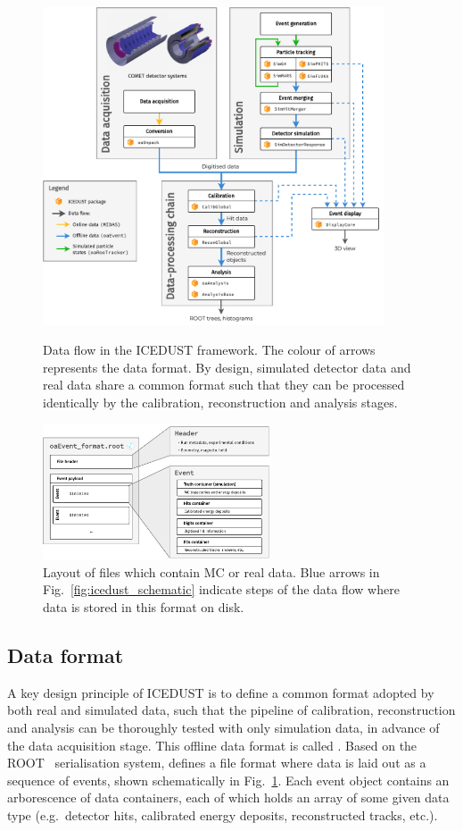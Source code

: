 \begin{figure}
    \centering
    \includegraphics[width=0.9\textwidth]{chapter3/ICEDUST_vertical.drawio.pdf}
    \caption{Data flow in the ICEDUST framework. The colour of arrows represents the data format. By design, simulated detector data and real data share a common format such that they can be processed identically by the calibration, reconstruction and analysis stages.}
    \label{fig:icedust_schematic}
    \vspace{1.2cm}
    \includegraphics[width=0.6\textwidth]{chapter3/oaEvent.drawio.pdf}
    \caption{Layout of \oaEvent files which contain MC or real data. Blue arrows in Fig.~\ref{fig:icedust_schematic} indicate steps of the data flow where data is stored in this format on disk.}
    \label{fig:oaEvent}
\end{figure}

\subsection{Data format}
A key design principle of ICEDUST is to define a common format adopted by both real and simulated data, such that the pipeline of calibration, reconstruction and analysis can be thoroughly tested with only simulation data, in advance of the data acquisition stage. 
This offline data format is called \oaEvent. Based on the ROOT~\cite{BRUN199781} serialisation system, \oaEvent defines a file format where data is laid out as a sequence of events, shown schematically in Fig.~\ref{fig:oaEvent}. Each event object contains an arborescence of data containers, each of which holds an array of some given data type (e.g.\ detector hits, calibrated energy deposits, reconstructed tracks, etc.).

